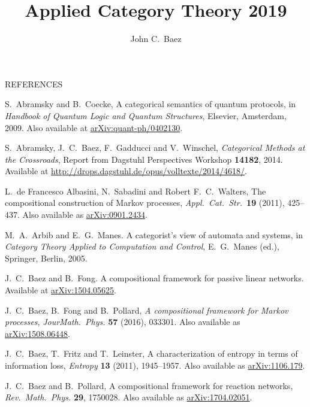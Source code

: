 \documentclass[12pt]{amsart}
\begin{document}
\centerline{\large REFERENCES}
\title{Applied Category Theory 2019}
\author{John C.\ Baez}

\maketitle

\begin{thebibliography}{10}

 S.\ Abramsky and B.\ Coecke, A categorical semantics of quantum protocols, in \textsl{Handbook of Quantum Logic and Quantum Structures}, Elsevier, Amsterdam, 2009.  Also available at \href{https://arxiv.org/abs/quant-ph/0402130}{arXiv:quant-ph/0402130}.

 S.\ Abramsky, J.\ C.\ Baez, F.\ Gadducci and V.\ Winschel, \textsl{Categorical Methods at the Crossroads}, Report from Dagstuhl Perspectives Workshop \textbf{14182}, 2014.  Available at \href{http://drops.dagstuhl.de/opus/volltexte/2014/4618/}{http://drops.dagstuhl.de/opus/volltexte/2014/4618/}.

 L.\ de Francesco Albasini, N.\ Sabadini and Robert F.\ C.\ Walters, The compositional construction of Markov processes, \textsl{Appl.\ Cat.\ Str.\ }{\bf 19} (2011), 425--437.
Also available as \href{http://arxiv.org/abs/0901.2434}{arXiv:0901.2434}.

 M.\ A.\ Arbib and E.\ G.\ Manes. A categorist’s view of automata and systems, in \textsl{Category Theory Applied to Computation and Control}, E.\ G.\ Manes (ed.), Springer, Berlin, 2005.

  J.\ C.\ Baez and B.\ Fong. A compositional framework for passive linear networks.  Available at \href{https://arxiv.org/abs/1504.05625}{arXiv:1504.05625}.

  J.\ C.\ Baez, B.\ Fong and B.\ Pollard, \textsl{A compositional framework for Markov processes}, \textsl{Jour\. Math.\ Phys.} \textbf{57} (2016), 033301. Also available as \href{https://arxiv.org/abs/1508.06448}{arXiv:1508.06448}.

  J.\ C.\ Baez, T.\ Fritz and T.\ Leinster, A characterization of entropy in terms of information loss, \textsl{Entropy} \textbf{13} (2011), 1945--1957.  Also available as \href{https://arxiv.org/abs/1106.1791}{arXiv:1106.179}.

 J.\ C.\ Baez and B.\ Pollard, A compositional framework for reaction networks, 
\textsl{Rev.\ Math.\ Phys.} \textbf{29}, 1750028.  Also available as \href{https://arxiv.org/abs/1704.02051}{arXiv:1704.02051}.


\end{thebibliography}
\end{document}
